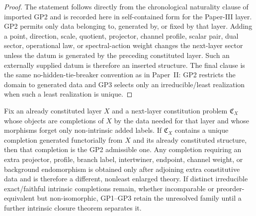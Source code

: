 \documentclass[11pt,a4paper]{article}
\begin{document}
\begin{proof}
The statement follows directly from the chronological naturality clause of imported GP2 and is recorded here in self-contained form for the Paper-III layer.  GP2 permits only data belonging to, generated by, or fixed by that layer.  Adding a point, direction, scale, quotient, projector, channel profile, scalar pair, dual sector, operational law, or spectral-action weight changes the next-layer sector unless the datum is generated by the preceding constituted layer.  Such an externally supplied datum is therefore an inserted structure.  The final clause is the same no-hidden-tie-breaker convention as in Paper~II: GP2 restricts the domain to generated data and GP3 selects only an irreducible/least realization when such a least realization is unique.
\end{proof}


\begin{corollary}
\label{p3:cor:initial-closure-no-insertion}
Fix an already constituted layer \(X\) and a next-layer constitution problem \(\mathfrak C_X\) whose objects are completions of \(X\) by the data needed for that layer and whose morphisms forget only non-intrinsic added labels.  If \(\mathfrak C_X\) contains a unique completion generated functorially from \(X\) and its already constituted structure, then that completion is the GP2 admissible one.  Any completion requiring an extra projector, profile, branch label, intertwiner, endpoint, channel weight, or background endomorphism is obtained only after adjoining extra constitutive data and is therefore a different, nonleast enlarged theory.  If distinct irreducible exact/faithful intrinsic completions remain, whether incomparable or preorder-equivalent but non-isomorphic, GP1--GP3 retain the unresolved family until a further intrinsic closure theorem separates it.
\end{corollary}
\end{document}
